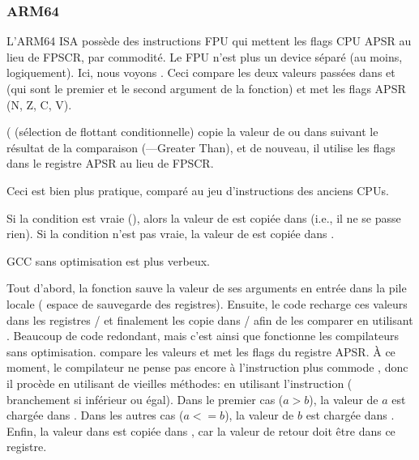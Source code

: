 \subsubsection{ARM64}




L'ARM64 \ac{ISA} possède des instructions FPU qui mettent les flags CPU \ac{APSR}
au lieu de \ac{FPSCR}, par commodité.
Le \ac{FPU} n'est plus un device séparé (au moins, logiquement).
Ici, nous voyons . Ceci compare les deux valeurs passées dans 
et  (qui sont le premier et le second argument de la fonction) et met les
flags \ac{APSR} (N, Z, C, V).

 ( (sélection de flottant conditionnelle)
copie la valeur de  ou  dans  suivant le résultat de la comparaison
(---Greater Than), et de nouveau, il utilise les flags dans le registre \ac{APSR}
au lieu de \ac{FPSCR}.

Ceci est bien plus pratique, comparé au jeu d'instructions des anciens CPUs.

Si la condition est vraie (), alors la valeur de  est copiée dans
 (i.e., il ne se passe rien).
Si la condition n'est pas vraie, la valeur de  est copiée dans .




GCC sans optimisation est plus verbeux.

Tout d'abord, la fonction sauve la valeur de ses arguments en entrée dans la pile
locale ( espace de sauvegarde des registres).
Ensuite, le code recharge ces valeurs dans les registres / et finalement
les copie dans / afin de les comparer en utilisant .
Beaucoup de code redondant, mais c'est ainsi que fonctionne les compilateurs sans
optimisation.
 compare les valeurs et met les flags du registre \ac{APSR}.
À ce moment, le compilateur ne pense pas encore à l'instruction plus commode ,
donc il procède en utilisant de vieilles méthodes:
en utilisant l'instruction  ( branchement si
inférieur ou égal).
Dans le premier cas ($a>b$), la valeur de $a$ est chargée dans .
Dans les autres cas ($a<=b$), la valeur de $b$ est chargée dans .
Enfin, la valeur dans  est copiée dans , car la valeur de retour
doit être dans ce registre.

